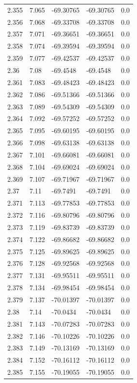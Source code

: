 \begin{tabular}{lllll}
2.355 & 7.065 & -69.30765 & -69.30765 & 0.0 \\
2.356 & 7.068 & -69.33708 & -69.33708 & 0.0 \\
2.357 & 7.071 & -69.36651 & -69.36651 & 0.0 \\
2.358 & 7.074 & -69.39594 & -69.39594 & 0.0 \\
2.359 & 7.077 & -69.42537 & -69.42537 & 0.0 \\
2.36 & 7.08 & -69.4548 & -69.4548 & 0.0 \\
2.361 & 7.083 & -69.48423 & -69.48423 & 0.0 \\
2.362 & 7.086 & -69.51366 & -69.51366 & 0.0 \\
2.363 & 7.089 & -69.54309 & -69.54309 & 0.0 \\
2.364 & 7.092 & -69.57252 & -69.57252 & 0.0 \\
2.365 & 7.095 & -69.60195 & -69.60195 & 0.0 \\
2.366 & 7.098 & -69.63138 & -69.63138 & 0.0 \\
2.367 & 7.101 & -69.66081 & -69.66081 & 0.0 \\
2.368 & 7.104 & -69.69024 & -69.69024 & 0.0 \\
2.369 & 7.107 & -69.71967 & -69.71967 & 0.0 \\
2.37 & 7.11 & -69.7491 & -69.7491 & 0.0 \\
2.371 & 7.113 & -69.77853 & -69.77853 & 0.0 \\
2.372 & 7.116 & -69.80796 & -69.80796 & 0.0 \\
2.373 & 7.119 & -69.83739 & -69.83739 & 0.0 \\
2.374 & 7.122 & -69.86682 & -69.86682 & 0.0 \\
2.375 & 7.125 & -69.89625 & -69.89625 & 0.0 \\
2.376 & 7.128 & -69.92568 & -69.92568 & 0.0 \\
2.377 & 7.131 & -69.95511 & -69.95511 & 0.0 \\
2.378 & 7.134 & -69.98454 & -69.98454 & 0.0 \\
2.379 & 7.137 & -70.01397 & -70.01397 & 0.0 \\
2.38 & 7.14 & -70.0434 & -70.0434 & 0.0 \\
2.381 & 7.143 & -70.07283 & -70.07283 & 0.0 \\
2.382 & 7.146 & -70.10226 & -70.10226 & 0.0 \\
2.383 & 7.149 & -70.13169 & -70.13169 & 0.0 \\
2.384 & 7.152 & -70.16112 & -70.16112 & 0.0 \\
2.385 & 7.155 & -70.19055 & -70.19055 & 0.0 \\

\end{tabular}
